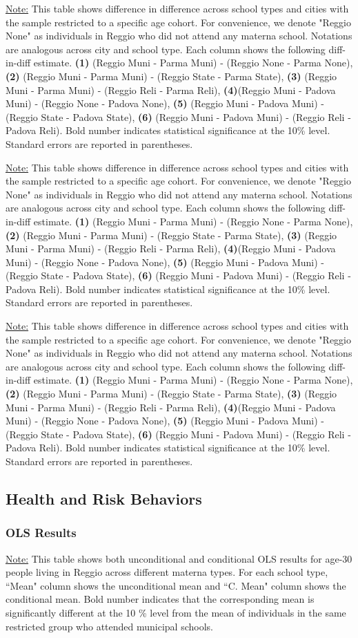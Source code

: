 \documentclass[11pt]{article}
\newcommand{\fnDID}{\underline{Note:} This table shows difference in difference across school types and cities with the sample restricted to a specific age cohort. For convenience, we denote "Reggio None" as individuals in Reggio who did not attend any materna school. Notations are analogous across city and school type. Each column shows the following diff-in-diff estimate. \textbf{(1)} (Reggio Muni - Parma Muni) - (Reggio None - Parma None), \textbf{(2)} (Reggio Muni - Parma Muni) - (Reggio State - Parma State), \textbf{(3)} (Reggio Muni - Parma Muni) - (Reggio Reli - Parma Reli), \textbf{(4)}(Reggio Muni - Padova Muni) - (Reggio None - Padova None),  \textbf{(5)}  (Reggio Muni - Padova Muni) - (Reggio State - Padova State), \textbf{(6)}  (Reggio Muni - Padova Muni) - (Reggio Reli - Padova Reli). Bold number indicates statistical significance at the 10\% level. Standard errors are reported in parentheses.}
\begin{document}
\begin{table}[H]
\begin{center}
	\caption{Difference-in-Difference Across School Types and Cities, Restricting to Age-30 Cohort} \label{table:LCh-30}
	\scalebox{0.80}{
		}
\end{center}
\footnotesize
\fnDID
\end{table}

\begin{table}[H]
\begin{center}
	\caption{Difference-in-Difference Across School Types and Cities, Restricting to Age-40 Cohort} \label{table:LCh-40}
	\scalebox{0.80}{
		}
\end{center}
\footnotesize
\fnDID
\end{table}

\begin{table}[H]
\begin{center}
	\caption{Difference-in-Difference Across School Types and Cities, Restricting to Age-50 Cohort} \label{table:LCh-50}
	\scalebox{0.80}{
		}
\end{center}
\footnotesize
\fnDID
\end{table}





\subsection{Health and Risk Behaviors}

\subsubsection{OLS Results}
\begin{table}[H]
\begin{center}
	\caption{OLS Results} \label{table:OLS-H}
	\end{center}
	\footnotesize
\underline{Note:} This table shows both unconditional and conditional OLS results for age-30 people living in Reggio across different materna types. For each school type, ``Mean" column shows the unconditional mean and ``C. Mean" column shows the conditional mean. Bold number indicates that the corresponding mean is significantly different at the 10 \% level from the mean of individuals in the same restricted group who attended municipal schools.

\end{table}
\end{document}
